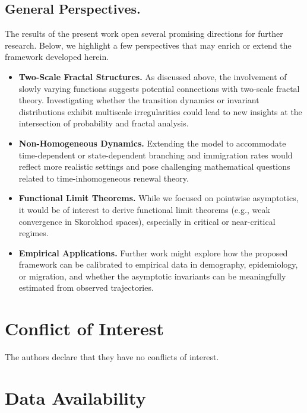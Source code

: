 \documentclass[10pt,reqno]{amsart}
\theoremstyle{definition}
\numberwithin{equation}{section}
\begin{document}
\subsection{General Perspectives.}

    The results of the present work open several promising directions for further research. Below, we highlight
    a few perspectives that may enrich or extend the framework developed herein.

\begin{itemize}
\item \textbf{Two-Scale Fractal Structures.} As discussed above, the involvement of slowly varying functions
    suggests potential connections with two-scale fractal theory. Investigating whether the transition dynamics
    or invariant distributions exhibit multiscale irregularities could lead to new insights at the intersection
    of probability and fractal analysis.

\item \textbf{Non-Homogeneous Dynamics.} Extending the model to accommodate time-dependent or state-dependent
    branching and immigration rates would reflect more realistic settings and pose challenging mathematical
    questions related to time-inhomogeneous renewal theory.

\item \textbf{Functional Limit Theorems.} While we focused on pointwise asymptotics, it would be of interest to derive
    functional limit theorems (e.g., weak convergence in Skorokhod spaces), especially in critical or near-critical regimes.

\item \textbf{Empirical Applications.} Further work might explore how the proposed framework can be calibrated
    to empirical data in demography, epidemiology, or migration, and whether the asymptotic invariants can
    be meaningfully estimated from observed trajectories.
\end{itemize}





\section*{Conflict of Interest}

    The authors declare that they have no conflicts of interest.


\section*{Data Availability}
\end{document}
